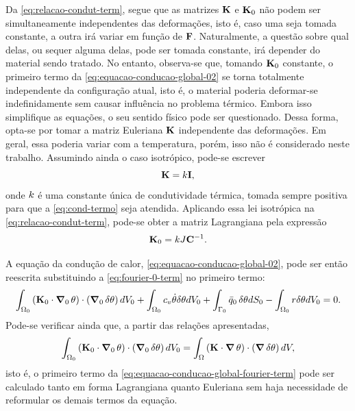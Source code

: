 \documentclass[Tese.tex]{subfiles}
\begin{document}
Da \cref{eq:relacao-condut-term}, segue que as matrizes $\mathbf{K}$ e $\mathbf{K}_0$ não podem ser simultaneamente independentes das deformações, isto é, caso uma seja tomada constante, a outra irá variar em função de $\mathbf{F}$. Naturalmente, a questão sobre qual delas, ou sequer alguma delas, pode ser tomada constante, irá depender do material sendo tratado. No entanto, observa-se que, tomando $\mathbf{K}_0$ constante, o primeiro termo da \cref{eq:equacao-conducao-global-02} se torna totalmente independente da configuração atual, isto é, o material poderia deformar-se indefinidamente sem causar influência no problema térmico. Embora isso simplifique as equações, o seu sentido físico pode ser questionado. Dessa forma, opta-se por tomar a matriz Euleriana $\mathbf{K}$ independente das deformações. Em geral, essa poderia variar com a temperatura, porém, isso não é considerado neste trabalho. Assumindo ainda o caso isotrópico, pode-se escrever 
\begin{equation}
\mathbf{K}=k\mathbf{I},
\end{equation}onde $k$ é uma constante única de condutividade térmica, tomada sempre positiva para que a \cref{eq:cond-termo} seja atendida. Aplicando essa lei isotrópica na \cref{eq:relacao-condut-term}, pode-se obter a matriz Lagrangiana pela expressão 
\begin{equation}\label{eq:condutMat-term}
\mathbf{K}_0 = k J \mathbf{C}^{-1}. 
\end{equation}

A equação da condução de calor, \eqref{eq:equacao-conducao-global-02}, pode ser então reescrita substituindo a \cref{eq:fourier-0-term} no primeiro termo:
\begin{equation}\label{eq:equacao-conducao-global-fourier-term}
\int_{\Omega_0}\left(\mathbf{K}_0\cdot\boldsymbol{\nabla}_0\,\theta\right)\cdot\left(\boldsymbol{\nabla}_0\,\delta\theta\right) dV_0 + \int_{\Omega_0}c_v\dot{\theta}\delta\theta dV_0 + \int_{\Gamma_0}\bar{q}_0\,\delta\theta dS_0 - \int_{\Omega_0} r\delta\theta dV_0 = 0.
\end{equation}
Pode-se verificar ainda que, a partir das relações apresentadas,
\begin{equation}\label{eq:relacao-condut-int-term}
\int_{\Omega_0}\left(\mathbf{K}_0\cdot\boldsymbol{\nabla}_0\,\theta\right)\cdot\left(\boldsymbol{\nabla}_0\,\delta\theta\right) dV_0 = \int_{\Omega}\left(\mathbf{K}\cdot\boldsymbol{\nabla}\,\theta\right)\cdot\left(\boldsymbol{\nabla}\,\delta\theta\right) dV,
\end{equation}
isto é, o primeiro termo da \cref{eq:equacao-conducao-global-fourier-term} pode ser calculado tanto em forma Lagrangiana quanto Euleriana sem haja necessidade de reformular os demais termos da equação.
\end{document}
